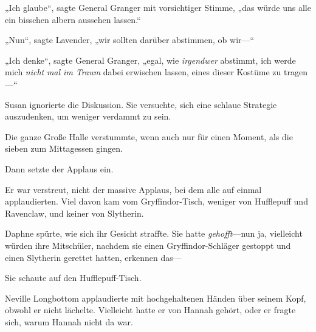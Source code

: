 „Ich glaube“, sagte General Granger mit vorsichtiger Stimme, „das würde uns alle ein bisschen albern aussehen lassen.“

„Nun“, sagte Lavender, „wir sollten darüber abstimmen, ob wir—“

„Ich denke“, sagte General Granger, „egal, wie \emph{irgendwer} abstimmt, ich werde mich \emph{nicht} \emph{mal im Traum} dabei erwischen lassen, eines dieser Kostüme zu tragen—“

Susan ignorierte die Diskussion. Sie versuchte, sich eine schlaue Strategie auszudenken, um weniger verdammt zu sein.

\later

Die ganze Große Halle verstummte, wenn auch nur für einen Moment, als die sieben zum Mittagessen gingen.

Dann setzte der Applaus ein.

Er war verstreut, nicht der massive Applaus, bei dem alle auf einmal applaudierten. Viel davon kam vom Gryffindor-Tisch, weniger von Hufflepuff und Ravenclaw, und keiner von Slytherin.

Daphne spürte, wie sich ihr Gesicht straffte. Sie hatte \emph{gehofft}—nun ja, vielleicht würden ihre Mitschüler, nachdem sie einen Gryffindor-Schläger gestoppt und einen Slytherin gerettet hatten, erkennen das—

Sie schaute auf den Hufflepuff-Tisch.

Neville Longbottom applaudierte mit hochgehaltenen Händen über seinem Kopf, obwohl er nicht lächelte. Vielleicht hatte er von Hannah gehört, oder er fragte sich, warum Hannah nicht da war.

